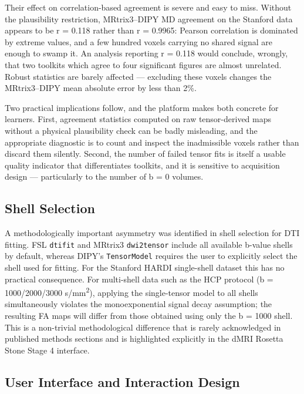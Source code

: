 \documentclass[12pt,a4paper]{article}
\begin{document}
Their effect on correlation-based agreement is severe and easy to miss. Without the plausibility restriction, MRtrix3--DIPY MD agreement on the Stanford data appears to be r = 0.118 rather than r = 0.9965: Pearson correlation is dominated by extreme values, and a few hundred voxels carrying no shared signal are enough to swamp it. An analysis reporting r = 0.118 would conclude, wrongly, that two toolkits which agree to four significant figures are almost unrelated. Robust statistics are barely affected --- excluding these voxels changes the MRtrix3--DIPY mean absolute error by less than 2\%.

Two practical implications follow, and the platform makes both concrete for learners. First, agreement statistics computed on raw tensor-derived maps without a physical plausibility check can be badly misleading, and the appropriate diagnostic is to count and inspect the inadmissible voxels rather than discard them silently. Second, the number of failed tensor fits is itself a usable quality indicator that differentiates toolkits, and it is sensitive to acquisition design --- particularly to the number of b = 0 volumes.

\subsection{Shell Selection}\label{shell-selection}

A methodologically important asymmetry was identified in shell selection for DTI fitting. FSL \texttt{dtifit} and MRtrix3 \texttt{dwi2tensor} include all available b-value shells by default, whereas DIPY's \texttt{TensorModel} requires the user to explicitly select the shell used for fitting. For the Stanford HARDI single-shell dataset this has no practical consequence. For multi-shell data such as the HCP protocol (b = 1000/2000/3000 s/mm\textsuperscript{2}), applying the single-tensor model to all shells simultaneously violates the monoexponential signal decay assumption; the resulting FA maps will differ from those obtained using only the b = 1000 shell. This is a non-trivial methodological difference that is rarely acknowledged in published methods sections and is highlighted explicitly in the dMRI Rosetta Stone Stage 4 interface.

\subsection{User Interface and Interaction Design}\label{user-interface-and-interaction-design}
\end{document}
